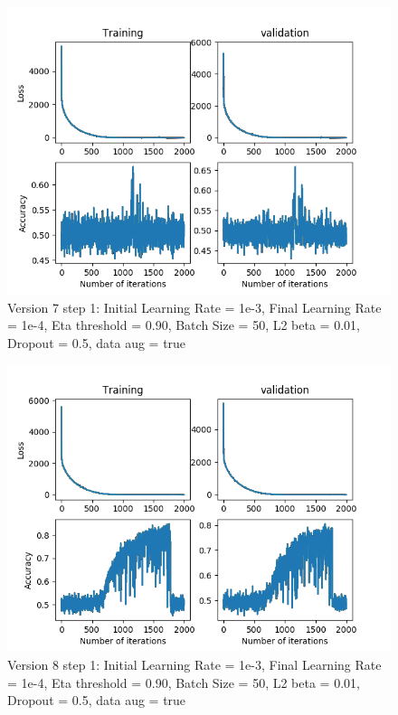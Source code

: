 \documentclass[12pt,reqno]{amsart}
\numberwithin{equation}{section}
\begin{document}
\begin{enumerate}
\begin{figure}[H]
\centering
\includegraphics[scale=0.6]{data_liquid140_version7_step1}
\caption{Version 7 step 1: Initial Learning Rate = 1e-3, Final Learning Rate = 1e-4, Eta threshold = 0.90, Batch Size = 50, L2 beta = 0.01, Dropout = 0.5, data aug = true}
\end{figure}

\begin{figure}[H]
\centering
\includegraphics[scale=0.6]{data_liquid140_version8_step1}
\caption{Version 8 step 1: Initial Learning Rate = 1e-3, Final Learning Rate = 1e-4, Eta threshold = 0.90, Batch Size = 50, L2 beta = 0.01, Dropout = 0.5, data aug = true}
\end{figure}


\end{enumerate}
\end{document}
